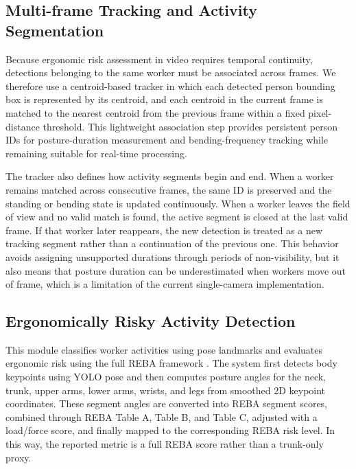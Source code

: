 \documentclass[11pt]{article}
\begin{document}
\subsection{  Multi-frame Tracking and  Activity   Segmentation }
  Because ergonomic risk assessment in video requires temporal continuity, detections belonging to the same worker must be associated across frames. We therefore use a centroid-based tracker in which each detected person bounding box is represented by its centroid, and each centroid in the current frame is matched to the nearest centroid from the previous frame within a fixed pixel-distance threshold. This lightweight association step provides persistent person IDs for posture-duration measurement and bending-frequency tracking while remaining suitable for real-time processing.

The tracker also defines how activity segments begin and end. When a worker remains matched across consecutive frames, the same ID is preserved and the standing or bending state is updated continuously. When a worker leaves the field of view and no valid match is found, the active segment is closed at the last valid frame. If that worker later reappears, the new detection is treated as a new tracking segment rather than a continuation of the previous one. This behavior avoids assigning unsupported durations through periods of non-visibility, but it also means that posture duration can be underestimated when workers move out of frame, which is a limitation of the current single-camera implementation.

\subsection{Ergonomically Risky Activity Detection}
This module classifies worker activities using pose landmarks and evaluates ergonomic risk using the full REBA framework \citep{hignett2000rapid}. The system first detects body keypoints using YOLO pose and then computes posture angles for the neck, trunk, upper arms, lower arms, wrists, and legs from smoothed 2D keypoint coordinates. These segment angles are converted into REBA segment scores, combined through REBA Table A, Table B, and Table C, adjusted with a load/force score, and finally mapped to the corresponding REBA risk level. In this way, the reported metric is a full REBA score rather than a trunk-only proxy.
\end{document}
